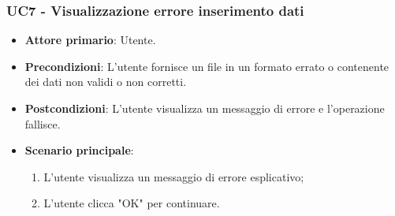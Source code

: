 \subsubsection{UC7 - Visualizzazione errore inserimento dati}
\begin{itemize}
	\item \textbf{Attore primario}: Utente.
	\item \textbf{Precondizioni}: L'utente fornisce un file in un formato errato o contenente dei dati non validi o non corretti.
	\item \textbf{Postcondizioni}: L'utente visualizza un messaggio di errore e l'operazione fallisce.
	\item \textbf{Scenario principale}:
		\begin{enumerate}
			\item L'utente visualizza un messaggio di errore esplicativo;
			\item L'utente clicca "OK" per continuare.
		\end{enumerate}
\end{itemize}